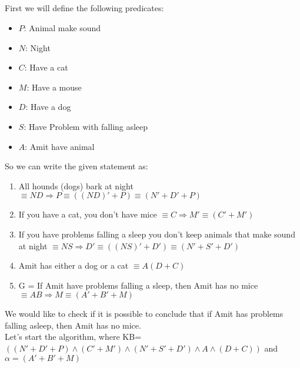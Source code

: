 \documentclass{article}
\begin{document}
\subsection{}
First we will define the following predicates:
\begin{itemize}
    \item $P$: Animal make sound
    \item $N$: Night
    \item $C$: Have a cat
    \item $M$: Have a mouse
    \item $D$: Have a dog
    \item $S$: Have Problem with falling asleep
    \item $A$: Amit have animal
\end{itemize}
So we can write the given statement as:
\begin{enumerate}
    \item All hounds (dogs) bark at night $\equiv ND \Rightarrow P \equiv ((ND)'+P) \equiv (N'+D'+P)$
    \item If you have a cat, you don’t have mice $\equiv C \Rightarrow M' \equiv (C'+M')$
    \item If you have problems falling a sleep you don’t keep animals that make sound at night $\equiv NS \Rightarrow D' \equiv ((NS)'+D') \equiv (N'+S'+D')$
    \item Amit has either a dog or a cat $\equiv A(D+C)$
    \item G = If Amit have problems falling a sleep, then Amit has no mice $\equiv AB \Rightarrow M \equiv (A'+B'+M)$
\end{enumerate}
We would like to check if it is possible to conclude that if Amit has problems falling asleep, then Amit has no mice.\\
Let's start the algorithm, where KB=$((N'+D'+P) \land (C'+M') \land (N'+S'+D') \land A \land (D+C))$ and $\alpha =  (A'+B'+M)$\\
\end{document}
